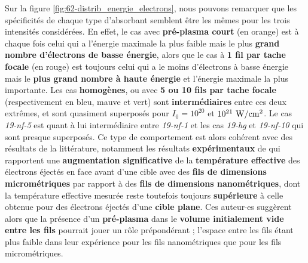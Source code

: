 \begin{refsection}
Sur la figure \ref{fig:62-distrib_energie_electrons}, nous pouvons remarquer que les spécificités de chaque type d'absorbant semblent être les mêmes pour les trois intensités considérées. En effet, le cas avec \textbf{pré-plasma court} (en orange) est à chaque fois celui qui a l'énergie maximale la plus faible mais le plus \textbf{grand nombre d'électrons de basse énergie}, alors que le cas à \textbf{1 fil par tache focale} (en rouge) est toujours celui qui a le moins d'électrons à basse énergie mais le \textbf{plus grand nombre à haute énergie} et l'énergie maximale la plus importante. Les cas \textbf{homogènes}, ou avec \textbf{5 ou 10 fils par tache focale} (respectivement en bleu, mauve et vert) sont \textbf{intermédiaires} entre ces deux extrêmes, et sont quasiment superposés pour $I_0=10^{20}$ et $10^{21}  ~ \rm W/cm^2$. Le cas \textit{19-nf-5} est quant à lui intermédiaire entre \textit{19-nf-1} et les cas \textit{19-hg} et \textit{19-nf-10} qui sont presque superposés. 
Ce type de comportement est alors cohérent avec des résultats de la littérature, notamment les résultats \textbf{expérimentaux} de \cite{cristoforetti_2017} qui rapportent une \textbf{augmentation significative} de la \textbf{température effective} des électrons éjectés en face avant d'une cible avec des \textbf{fils de dimensions micrométriques} par rapport à des \textbf{fils de dimensions nanométriques}, dont la température effective mesurée reste toutefois toujours \textbf{supérieure} à celle obtenue pour des électrons éjectés d'une \textbf{cible plane}. Ces auteur$\cdot$es suggèrent alors que la présence d'un \textbf{pré-plasma} dans le \textbf{volume initialement vide entre les fils} pourrait jouer un rôle prépondérant ; l'espace entre les fils étant plus faible dans leur expérience pour les fils nanométriques que pour les fils micrométriques. 

\end{refsection}
